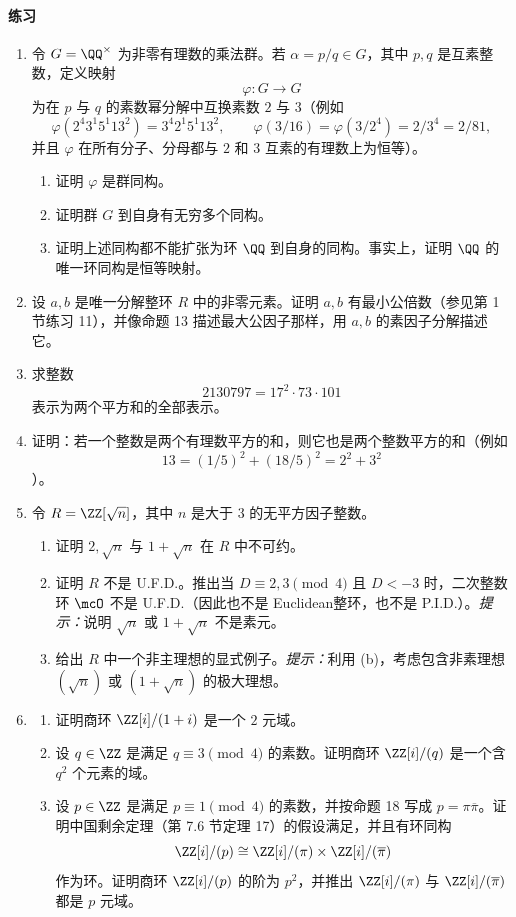 \paragraph{练习}
\begin{enumerate}[label=\arabic*.]
	\item 令 $G=\QQ^\times$ 为非零有理数的乘法群。若 $\alpha=p/q\in G$，其中 $p,q$ 是互素整数，定义映射
	\[
	\varphi:G\longrightarrow G
	\]
	为在 $p$ 与 $q$ 的素数幂分解中互换素数 $2$ 与 $3$（例如
	\[
	\varphi(2^4 3^1 5^1 13^2)=3^4 2^1 5^1 13^2,
	\qquad
	\varphi(3/16)=\varphi(3/2^4)=2/3^4=2/81,
	\]
	并且 $\varphi$ 在所有分子、分母都与 $2$ 和 $3$ 互素的有理数上为恒等）。
	\begin{enumerate}[label=(\alph*)]
		\item 证明 $\varphi$ 是群同构。
		\item 证明群 $G$ 到自身有无穷多个同构。
		\item 证明上述同构都不能扩张为环 $\QQ$ 到自身的同构。事实上，证明 $\QQ$ 的唯一环同构是恒等映射。
	\end{enumerate}
	
	\item 设 $a,b$ 是唯一分解整环 $R$ 中的非零元素。证明 $a,b$ 有最小公倍数（参见第 1 节练习 11），并像命题 13 描述最大公因子那样，用 $a,b$ 的素因子分解描述它。
	
	\item 求整数
	\[
	2130797=17^2\cdot73\cdot101
	\]
	表示为两个平方和的全部表示。
	
	\item 证明：若一个整数是两个有理数平方的和，则它也是两个整数平方的和（例如
	\[
	13=(1/5)^2+(18/5)^2=2^2+3^2
	\]
	）。
	
	\item 令 $R=\ZZ[\sqrt n]$，其中 $n$ 是大于 $3$ 的无平方因子整数。
	\begin{enumerate}[label=(\alph*)]
		\item 证明 $2,\sqrt n$ 与 $1+\sqrt n$ 在 $R$ 中不可约。
		\item 证明 $R$ 不是 U.F.D.。推出当 $D\equiv2,3\pmod4$ 且 $D<-3$ 时，二次整数环 $\mcO$ 不是 U.F.D.（因此也不是 Euclidean整环，也不是 P.I.D.）。\emph{提示：}说明 $\sqrt n$ 或 $1+\sqrt n$ 不是素元。
		\item 给出 $R$ 中一个非主理想的显式例子。\emph{提示：}利用 (b)，考虑包含非素理想 $(\sqrt n)$ 或 $(1+\sqrt n)$ 的极大理想。
	\end{enumerate}
	
	\item
	\begin{enumerate}[label=(\alph*)]
		\item 证明商环 $\ZZ[i]/(1+i)$ 是一个 $2$ 元域。
		\item 设 $q\in\ZZ$ 是满足 $q\equiv3\pmod4$ 的素数。证明商环 $\ZZ[i]/(q)$ 是一个含 $q^2$ 个元素的域。
		\item 设 $p\in\ZZ$ 是满足 $p\equiv1\pmod4$ 的素数，并按命题 18 写成 $p=\pi\overline\pi$。证明中国剩余定理（第 7.6 节定理 17）的假设满足，并且有环同构
		\[
		\ZZ[i]/(p)\cong \ZZ[i]/(\pi)\times \ZZ[i]/(\overline\pi)
		\]
		作为环。证明商环 $\ZZ[i]/(p)$ 的阶为 $p^2$，并推出 $\ZZ[i]/(\pi)$ 与 $\ZZ[i]/(\overline\pi)$ 都是 $p$ 元域。
	\end{enumerate}
	

\end{enumerate}
